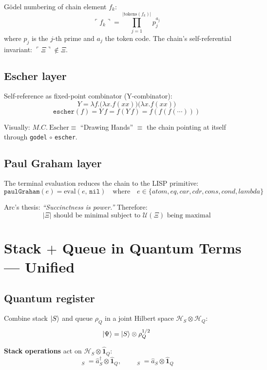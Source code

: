 \documentclass[12pt,a4paper]{article}
\DeclareMathOperator{\Push}{\widehat{P}^\dagger}
\DeclareMathOperator{\Pop}{\widehat{P}}
\newcommand{\gonum}[1]{\ulcorner #1 \urcorner}
\begin{document}
Gödel numbering of chain element $f_k$:
\[
  \gonum{f_k} = \prod_{j=1}^{|\text{tokens}(f_k)|} p_j^{a_j}
\]
where $p_j$ is the $j$-th prime and $a_j$ the token code.
The chain's self-referential invariant: $\gonum{\Xi} \not\in \Xi$.

\subsection{Escher layer}

Self-reference as fixed-point combinator (Y-combinator):
\[
  Y = \lambda f . \bigl(\lambda x . f(xx)\bigr)\bigl(\lambda x . f(xx)\bigr)
\]
\[
  \texttt{escher}(f) = Y\,f = f(Y\,f) = f(f(f(\cdots)))
\]

Visually: $M.\!C.\ \text{Escher} \equiv $ ``Drawing Hands'' $\equiv$ the chain
pointing at itself through \texttt{godel} $\circ$ \texttt{escher}.

\subsection{Paul Graham layer}

The terminal evaluation reduces the chain to the LISP primitive:
\[
  \texttt{paulGraham}(e) = \text{eval}(e,\, \texttt{nil})
  \quad\text{where}\quad
  e \in \{atom, eq, car, cdr, cons, cond, lambda\}
\]

Arc's thesis: \emph{``Succinctness is power.''} Therefore:
\[
  |\Xi| \text{ should be minimal subject to } \mathcal{U}(\Xi) \text{ being maximal}
\]

\section{Stack $+$ Queue in Quantum Terms — Unified}

\subsection{Quantum register}

Combine stack $\ket{S}$ and queue $\rho_Q$ in a joint Hilbert space
$\mathcal{H}_S \otimes \mathcal{H}_Q$:
\[
  \ket{\Psi} = \ket{S} \otimes \rho_Q^{1/2}
\]

\textbf{Stack operations} act on $\mathcal{H}_S \otimes \hat{\mathbf{1}}_Q$:
\[
  \Push_S = \hat{a}^\dagger_S \otimes \hat{\mathbf{1}}_Q, \qquad
  \Pop_S  = \hat{a}_S         \otimes \hat{\mathbf{1}}_Q
\]
\end{document}
